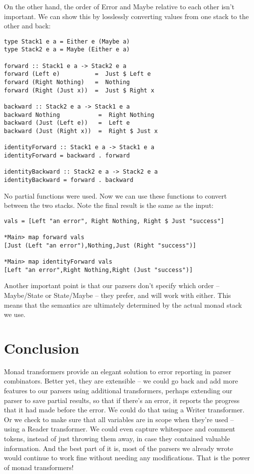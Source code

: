 \documentclass{tmr}
\begin{document}
On the other hand, the order of Error and Maybe relative to each other isn't 
important.  We can show this by losslessly converting values from one stack to 
the other and back:
\begin{verbatim}
type Stack1 e a = Either e (Maybe a)
type Stack2 e a = Maybe (Either e a)

forward :: Stack1 e a -> Stack2 e a
forward (Left e)          =  Just $ Left e
forward (Right Nothing)   =  Nothing
forward (Right (Just x))  =  Just $ Right x

backward :: Stack2 e a -> Stack1 e a
backward Nothing           =  Right Nothing
backward (Just (Left e))   =  Left e
backward (Just (Right x))  =  Right $ Just x

identityForward :: Stack1 e a -> Stack1 e a
identityForward = backward . forward

identityBackward :: Stack2 e a -> Stack2 e a
identityBackward = forward . backward
\end{verbatim}

No partial functions were used.  Now we can use these functions to
convert between the two stacks.  Note the final result is the same as the input:
\begin{verbatim}
vals = [Left "an error", Right Nothing, Right $ Just "success"]

*Main> map forward vals
[Just (Left "an error"),Nothing,Just (Right "success")]

*Main> map identityForward vals
[Left "an error",Right Nothing,Right (Just "success")]
\end{verbatim}

Another important point is that our parsers don't specify
which order -- Maybe/State or State/Maybe -- they prefer, and will 
work with either.  This means that the semantics are ultimately determined by 
the actual monad stack we use.




\section{Conclusion}
Monad transformers provide an elegant solution to error reporting in parser
combinators.  Better yet, they are extensible -- we could go back and add more
features to our parsers using additional transformers, perhaps extending our
parser to save partial results, so that if there's an error, it reports the
progress that it had made before the error.  We could do that using a Writer
transformer.  Or we check to make sure that all variables are in scope when
they're used -- using a Reader transformer.  We could even capture whitespace
and comment tokens, instead of just throwing them away, in case they contained
valuable information.  And the best part of it is, most of the parsers we already
wrote would continue to work fine without needing any modifications.  That
is the power of monad transformers!





\end{document}
